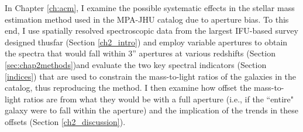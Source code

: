 In Chapter \ref{ch:acm}, I examine the possible systematic effects in the stellar mass estimation method used in the MPA-JHU catalog due to aperture bias. To this end, I use spatially resolved spectroscopic data from the largest IFU-based survey designed thusfar (Section \ref{ch2_intro}) and employ variable apertures to obtain the spectra that would fall within 3'' apertures at various redshifts (Section \ref{sec:chap2methods})and evaluate the two key spectral indicators (Section \ref{indices}) that are used to constrain the mass-to-light ratios of the galaxies in the catalog, thus reproducing the \citet{kauffmann_stellar_2003} method. I then examine how offset the mass-to-light ratios are from what they would be with a full aperture (i.e., if the ``entire" galaxy were to fall within the aperture) and the implication of the trends in these offsets (Section \ref{ch2_discussion}).\\







